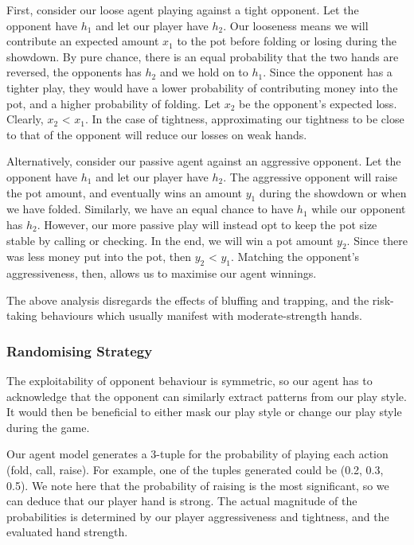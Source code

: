 \documentclass{article}
\begin{document}
First, consider our loose agent playing against a tight opponent. Let the opponent have $h_1$ and let our player have $h_2$. Our looseness means we will contribute an expected amount $x_1$ to the pot before folding or losing during the showdown. By pure chance, there is an equal probability that the two hands are reversed, the opponents has $h_2$ and we hold on to $h_1$. Since the opponent has a tighter play, they would have a lower probability of contributing money into the pot, and a higher probability of folding. Let $x_2$ be the opponent's expected loss. Clearly, $x_2$ < $x_1$. In the case of tightness, approximating our tightness to be close to that of the opponent will reduce our losses on weak hands.

Alternatively, consider our passive agent against an aggressive opponent.  Let the opponent have $h_1$ and let our player have $h_2$. The aggressive opponent will raise the pot amount, and eventually wins an amount $y_1$ during the showdown or when we have folded. Similarly, we have an equal chance to have $h_1$ while our opponent has $h_2$. However, our more passive play will instead opt to keep the pot size stable by calling or checking. In the end, we will win a pot amount $y_2$. Since there was less money put into the pot, then $y_2$ < $y_1$. Matching the opponent's aggressiveness, then, allows us to maximise our agent winnings.

The above analysis disregards the effects of bluffing and trapping, and the risk-taking behaviours which usually manifest with moderate-strength hands.

\subsubsection{Randomising Strategy}

The exploitability of opponent behaviour is symmetric, so our agent has to acknowledge that the opponent can similarly extract patterns from our play style. It would then be beneficial to either mask our play style or change our play style during the game.

Our agent model generates a 3-tuple for the probability of playing each action (fold, call, raise). For example, one of the tuples generated could be (0.2, 0.3, 0.5). We note here that the probability of raising is the most significant, so we can deduce that our player hand is strong. The actual magnitude of the probabilities is determined by our player aggressiveness and tightness, and the evaluated hand strength.
\end{document}
